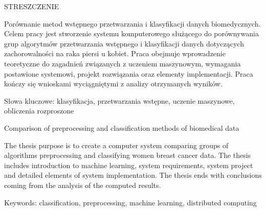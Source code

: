 \documentclass[../thesis.tex]{subfiles}
\begin{document}
\begin{center}
\fontsize{14pt}{18pt}\selectfont
STRESZCZENIE
\end{center}

\begin{flushleft}
Porównanie metod wstępnego przetwarzania i klasyfikacji danych biomedycznych. Celem pracy jest stworzenie systemu komputerowego służącego do porównywania grup algorytmów przetwarzania wstępnego i klasyfikacji danych dotyczących zachorowalności na raka piersi u kobiet. Praca obejmuje wprowadzenie teoretyczne do zagadnień związanych z uczeniem maszynowym, wymagania postawione systemowi, projekt rozwiązania oraz elementy implementacji. Praca kończy się wnioskami wyciągniętymi z analizy otrzymanych wyników.

\vspace{7.5cm}

Słowa kluczowe: klasyfikacja, przetwarzania wstępne, uczenie maszynowe, obliczenia rozproszone
\end{flushleft}

\noindent\makebox[\linewidth]{\rule{\linewidth}{0.4pt}}

\begin{center}
\fontsize{14pt}{18pt}\selectfont
Comparison of preprocessing and classification methods of biomedical data
\end{center}

\begin{flushleft}
The thesis purpose is to create a computer system comparing groups of algorithms preprocessing and classifying women breast cancer data. The thesis includes introduction to machine learning, system requirements, system project and detailed elements of system implementation. The thesis ends with conclusions coming from the analysis of the computed results.

\vspace{7.5cm}

Keywords: classification, preprocessing, machine learning, distributed computing
\end{flushleft}

\thispagestyle{empty}
\cleardoublepage 
\end{document}
